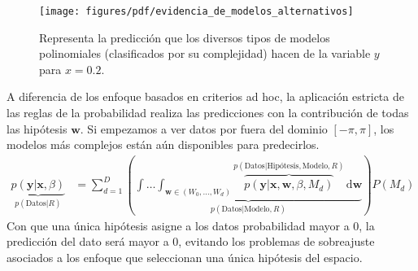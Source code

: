 \documentclass[a4paper,11pt]{book}
\theoremstyle{definition}
\begin{document}

\begin{figure}[ht!] \centering
 \texttt{[image: figures/pdf/evidencia\_de\_modelos\_alternativos]}
  \caption{Representa la predicci\'on que los diversos tipos de modelos polinomiales (clasificados por su complejidad) hacen de la variable $y$ para $x=0.2$.}
  \label{fig:balance_natural}
\end{figure}


A diferencia de los enfoque basados en criterios ad hoc, la aplicaci\'on estricta de las reglas de la probabilidad realiza las predicciones con la contribuci\'on de todas las hip\'otesis $\bm{w}$.
%
Si empezamos a ver datos por fuera del dominio $[-\pi, \pi]$, los modelos m\'as complejos est\'an a\'un disponibles para predecirlos.
%
\begin{equation*}
\begin{split}
\underbrace{p(\bm{y}|\bm{x},\beta)}_{p(\text{Datos}|R)} & = \sum_{d=1}^D \left( \underbrace{ \int\dots\int_{\bm{w} \in (W_0, \dots, W_d)} \overbrace{p(\bm{y}|\bm{x}, \bm{w}, \beta, M_d)}^{p(\text{Datos}|\text{Hip\'otesis},\text{Modelo},R)} \, \text{d}\bm{w} }_{p(\text{Datos}|\text{Modelo},R)} \right) P(M_d)
\end{split}
\end{equation*}
%
Con que una \'unica hip\'otesis asigne a los datos probabilidad mayor a $0$, la predicci\'on del dato ser\'a mayor a $0$, evitando los problemas de sobreajuste asociados a los enfoque que seleccionan una \'unica hip\'otesis del espacio.


%
\end{document}
